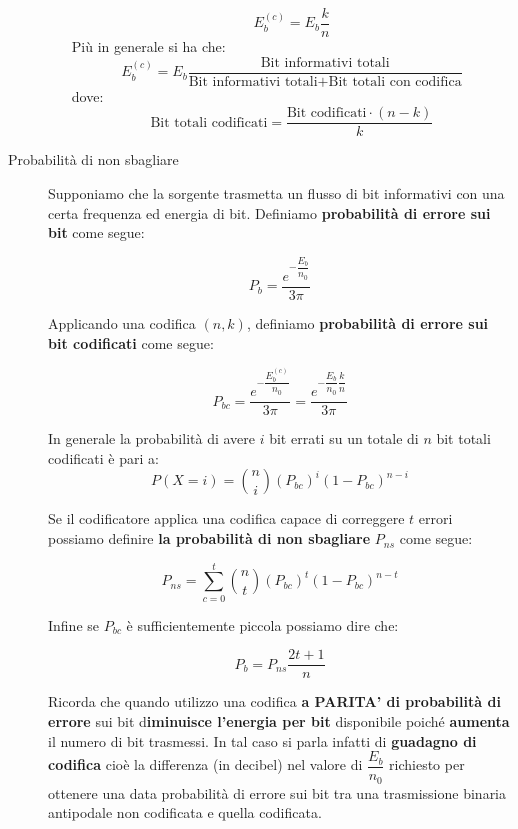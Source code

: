 \documentclass[10pt,a4paper]{article}
\begin{document}
\begin{description}
\begin{itemize}
\begin{equation}
E_b^{(c)} = E_b \dfrac{k}{n} 
\end{equation}
Più in generale si ha che:
\begin{equation}
E_b^{(c)} = E_b \dfrac{\text{Bit informativi totali}}{\text{Bit informativi totali} + \text{Bit totali con codifica}} 
\end{equation}
dove:
\begin{equation}
\text{Bit totali codificati} = \dfrac{\text{Bit codificati} \cdot (n-k)}{k}
\end{equation}

\end{itemize}


\item[Probabilità di non sbagliare]
Supponiamo che la sorgente trasmetta un flusso di bit informativi con una certa frequenza ed energia di bit. Definiamo \textbf{probabilità di errore sui bit} come segue: 

\begin{equation}
P_b = \dfrac{e^{-\dfrac{E_b}{n_0}}}{3\pi} 
\end{equation}

Applicando una codifica $(n,k)$, definiamo \textbf{probabilità di errore sui bit codificati} come segue:

\begin{equation}
P_{bc} = \dfrac{e^{-\dfrac{E_b^{(c)}}{n_0}}}{3\pi} = \dfrac{e^{-\dfrac{E_b}{n_0}\dfrac{k}{n}}}{3\pi}
\end{equation}

In generale la probabilità di avere $i$ bit errati su un totale di $n$ bit totali codificati è pari a:
\begin{equation}
P(X=i)=\binom{n}{i}(P_{bc})^i(1-P_{bc})^{n-i}
\end{equation}

Se il codificatore applica una codifica capace di correggere $t$ errori possiamo definire \textbf{la probabilità di non sbagliare} $P_{ns}$ come segue:

\begin{equation}
P_{ns}=\sum_{c=0}^t \binom{n}{t}(P_{bc})^t(1-P_{bc})^{n-t}
\end{equation}

Infine se $P_{bc}$ è sufficientemente piccola possiamo dire che:

\begin{equation}
P_b=P_{ns}\dfrac{2t + 1}{n}
\end{equation}

Ricorda che quando utilizzo una codifica \textbf{a PARITA' di probabilità di errore} sui bit d\textbf{iminuisce l'energia per bit} disponibile poiché \textbf{aumenta} il numero di bit trasmessi. In tal caso si parla infatti di \textbf{guadagno di codifica} cioè la differenza (in decibel) nel valore di $\dfrac{E_b}{n_0}$ richiesto per ottenere una data probabilità di errore sui bit tra una trasmissione binaria antipodale non codificata e quella codificata.


\end{description}
\end{document}
